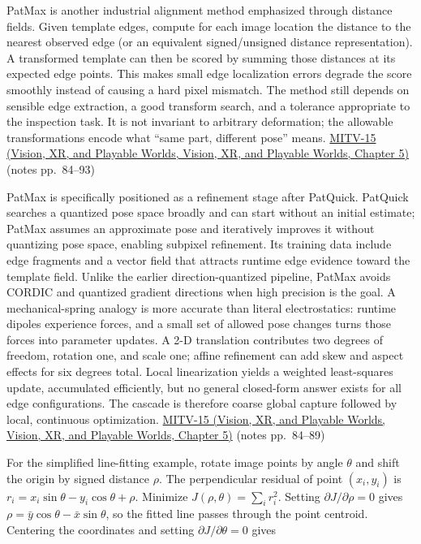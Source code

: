 PatMax is another industrial alignment method emphasized through distance fields. Given template edges, compute for each image location the distance to the nearest observed edge (or an equivalent signed/unsigned distance representation). A transformed template can then be scored by summing those distances at its expected edge points. This makes small edge localization errors degrade the score smoothly instead of causing a hard pixel mismatch. The method still depends on sensible edge extraction, a good transform search, and a tolerance appropriate to the inspection task. It is not invariant to arbitrary deformation; the allowable transformations encode what ``same part, different pose'' means. \href{../07-Vision-XR-and-Playable-Worlds/main.pdf\#nameddest=04-visual-computing-ii-ch036-mitv-15---alignment-patmax-distance-field-filtering-and-sub-sampling-us-7065262}{MITV-15 (Vision, XR, and Playable Worlds, Vision, XR, and Playable Worlds, Chapter 5)} (notes pp.~84--93)

PatMax is specifically positioned as a refinement stage after PatQuick. PatQuick searches a quantized pose space broadly and can start without an initial estimate; PatMax assumes an approximate pose and iteratively improves it without quantizing pose space, enabling subpixel refinement. Its training data include edge fragments and a vector field that attracts runtime edge evidence toward the template field. Unlike the earlier direction-quantized pipeline, PatMax avoids CORDIC and quantized gradient directions when high precision is the goal. A mechanical-spring analogy is more accurate than literal electrostatics: runtime dipoles experience forces, and a small set of allowed pose changes turns those forces into parameter updates. A 2-D translation contributes two degrees of freedom, rotation one, and scale one; affine refinement can add skew and aspect effects for six degrees total. Local linearization yields a weighted least-squares update, accumulated efficiently, but no general closed-form answer exists for all edge configurations. The cascade is therefore coarse global capture followed by local, continuous optimization. \href{../07-Vision-XR-and-Playable-Worlds/main.pdf\#nameddest=04-visual-computing-ii-ch036-mitv-15---alignment-patmax-distance-field-filtering-and-sub-sampling-us-7065262}{MITV-15 (Vision, XR, and Playable Worlds, Vision, XR, and Playable Worlds, Chapter 5)} (notes pp.~84--89)

For the simplified line-fitting example, rotate image points by angle \(\theta\) and shift the origin by signed distance \(\rho\). The perpendicular residual of point \((x_i,y_i)\) is \(r_i=x_i\sin\theta-y_i\cos\theta+\rho\). Minimize \(J(\rho,\theta)=\sum_i r_i^2\). Setting \(\partial J/\partial\rho=0\) gives \(\rho=\bar{y}\cos\theta-\bar{x}\sin\theta\), so the fitted line passes through the point centroid. Centering the coordinates and setting \(\partial J/\partial\theta=0\) gives

